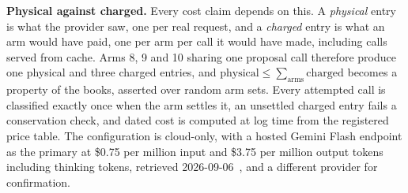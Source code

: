\textbf{Physical against charged.} Every cost claim depends on this. A
\emph{physical} entry is what the provider saw, one per real request, and a
\emph{charged} entry is what an arm would have paid, one per arm per call it would
have made, including calls served from cache. Arms 8, 9 and 10 sharing one
proposal call therefore produce one physical and three charged entries, and
$\text{physical} \le \sum_{\text{arms}} \text{charged}$ becomes a property of the
books, asserted over random arm sets. Every attempted call is classified exactly
once when the arm settles it, an unsettled charged entry fails a conservation
check, and dated cost is computed at log time from the registered price table. The configuration is cloud-only, with a hosted Gemini
Flash endpoint as the primary at \$0.75 per million input and \$3.75 per million
output tokens including thinking tokens, retrieved 2026-09-06~\cite{gemini-pricing}, and a different
provider for confirmation.
